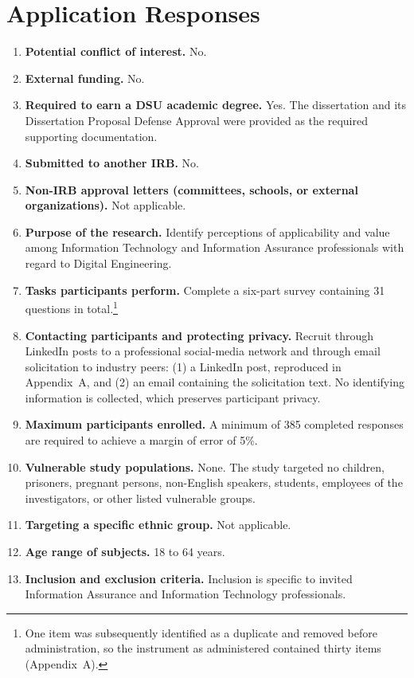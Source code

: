 \section{Application Responses}

\begin{enumerate}[leftmargin=2.4em,itemsep=2pt]
  \item \textbf{Potential conflict of interest.} No.
  \item \textbf{External funding.} No.
  \item \textbf{Required to earn a DSU academic degree.} Yes. The dissertation and its Dissertation Proposal Defense Approval were provided as the required supporting documentation.
  \item \textbf{Submitted to another IRB.} No.
  \item \textbf{Non-IRB approval letters (committees, schools, or external organizations).} Not applicable.
  \item \textbf{Purpose of the research.} Identify perceptions of applicability and value among Information Technology and Information Assurance professionals with regard to Digital Engineering.
  \item \textbf{Tasks participants perform.} Complete a six-part survey containing 31 questions in total.\footnote{One item was subsequently identified as a duplicate and removed before administration, so the instrument as administered contained thirty items (Appendix~A).}
  \item \textbf{Contacting participants and protecting privacy.} Recruit through LinkedIn posts to a professional social-media network and through email solicitation to industry peers: (1) a LinkedIn post, reproduced in Appendix~A, and (2) an email containing the solicitation text. No identifying information is collected, which preserves participant privacy.
  \item \textbf{Maximum participants enrolled.} A minimum of 385 completed responses are required to achieve a margin of error of 5\%.
  \item \textbf{Vulnerable study populations.} None. The study targeted no children, prisoners, pregnant persons, non-English speakers, students, employees of the investigators, or other listed vulnerable groups.
  \item \textbf{Targeting a specific ethnic group.} Not applicable.
  \item \textbf{Age range of subjects.} 18 to 64 years.
  \item \textbf{Inclusion and exclusion criteria.} Inclusion is specific to invited Information Assurance and Information Technology professionals.

\end{enumerate}
